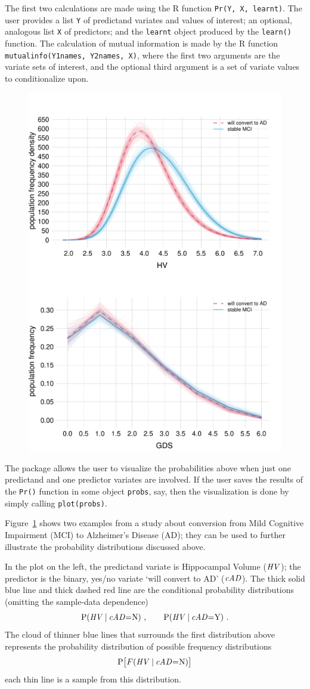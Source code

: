 The first two calculations are made using the R function \texttt{Pr(Y, X, learnt)}. The user provides a list \texttt{Y} of predictand variates and values of interest; an optional, analogous list \texttt{X} of predictors; and the \texttt{learnt} object produced by the \texttt{learn()} function. The calculation of mutual information is made by the R function \texttt{mutualinfo(Y1names, Y2names, X)}, where the first two arguments are the variate sets of interest, and the optional third argument is a set of variate values to conditionalize upon.

\medskip

\begin{figure}[t]
\centering%
\includegraphics[width=0.45\linewidth]{figures/population_distr_HV.pdf}\hfill%
\includegraphics[width=0.45\linewidth]{figures/population_distr_GDS.pdf}%
\\ \caption{}\label{fig:distr}
\end{figure}
The package allows the user to visualize the probabilities above when just one predictand and one predictor variates are involved. If the user saves the results of the \texttt{Pr()} function in some object \texttt{probs}, say, then the visualization is done by simply calling \texttt{plot(probs)}.

Figure~\ref{fig:distr} shows two examples from a study \citep{portamanaetal2023b} about conversion from Mild Cognitive Impairment (MCI) to Alzheimer's Disease (AD); they can be used to further illustrate the probability distributions discussed above.

In the plot on the left, the predictand variate is Hippocampal Volume ($\mathit{HV}$); the predictor is the binary, yes/no variate `will convert to AD' ($\mathit{cAD}$). The thick solid blue line and thick dashed red line are the conditional probability distributions (omitting the sample-data dependence)
\begin{equation*}
  \P( \HV \| \cAD \mo \yn)\ ,\qquad
  \P( \HV \| \cAD \mo \yy) \ .
\end{equation*}
The cloud of thinner blue lines that surrounds the first distribution above  represents the probability distribution of possible frequency distributions
\begin{equation*}
  \P\bigl[ \yF(\HV \| \cAD \mo \yn)\bigr]
\end{equation*}
each thin line is a sample from this distribution.

